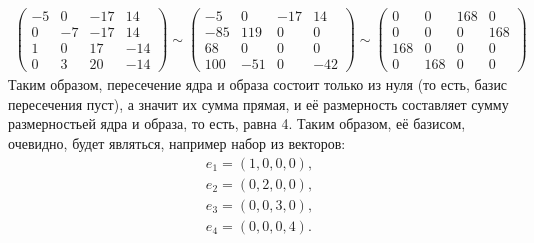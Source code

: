 \begin{gather*}
    \begin{pmatrix}
        -5 & 0 & -17 & 14\\
        0 & -7 & -17 & 14\\
        1 & 0 & 17 & -14\\
        0 & 3 & 20 & -14
    \end{pmatrix} \sim
    \begin{pmatrix}
        -5 & 0 & -17 & 14\\
        -85 & 119 & 0 & 0\\
        68 & 0 & 0 & 0\\
        100 & -51 & 0 & -42
    \end{pmatrix} \sim 
    \begin{pmatrix}
        0 & 0 & 168 & 0\\
        0 & 0 & 0 & 168\\
        168 & 0 & 0 & 0\\
        0 & 168 & 0 & 0
    \end{pmatrix}
\end{gather*}
Таким образом, пересечение ядра и образа состоит только из нуля (то есть, базис пересечения пуст), а значит их сумма прямая, и её размерность составляет сумму размерностьей ядра и образа, то есть, равна 4. Таким образом, её базисом, очевидно, будет являться, например набор из векторов:
\begin{gather*}
    e_1 = (1, 0, 0, 0),\\
    e_2 = (0, 2, 0, 0),\\
    e_3 = (0, 0, 3, 0),\\
    e_4 = (0, 0, 0, 4).
\end{gather*}

